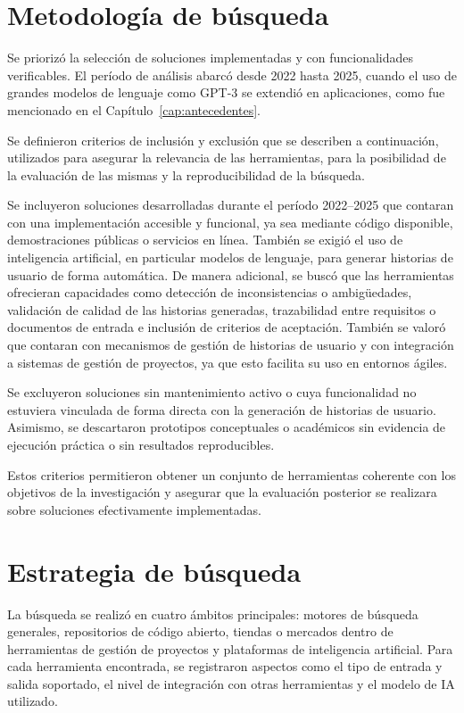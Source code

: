 \section{Metodología de búsqueda}
Se priorizó la selección de soluciones implementadas y con funcionalidades verificables. El período de análisis abarcó desde 2022 hasta 2025, cuando el uso de grandes modelos de lenguaje como GPT-3 se extendió en aplicaciones, como fue mencionado en el Capítulo~\ref{cap:antecedentes}.

Se definieron criterios de inclusión y exclusión que se describen a continuación, utilizados para asegurar la relevancia de las herramientas, para la posibilidad de la evaluación de las mismas y la reproducibilidad de la búsqueda.

Se incluyeron soluciones desarrolladas durante el período 2022--2025 que contaran con una implementación accesible y funcional, ya sea mediante código disponible, demostraciones públicas o servicios en línea. También se exigió el uso de inteligencia artificial, en particular modelos de lenguaje, para generar historias de usuario de forma automática. De manera adicional, se buscó que las herramientas ofrecieran capacidades como detección de inconsistencias o ambigüedades, validación de calidad de las historias generadas, trazabilidad entre requisitos o documentos de entrada e inclusión de criterios de aceptación. También se valoró que contaran con mecanismos de gestión de historias de usuario y con integración a sistemas de gestión de proyectos, ya que esto facilita su uso en entornos ágiles.

Se excluyeron soluciones sin mantenimiento activo o cuya funcionalidad no estuviera vinculada de forma directa con la generación de historias de usuario. Asimismo, se descartaron prototipos conceptuales o académicos sin evidencia de ejecución práctica o sin resultados reproducibles.

Estos criterios permitieron obtener un conjunto de herramientas coherente con los objetivos de la investigación y asegurar que la evaluación posterior se realizara sobre soluciones efectivamente implementadas.

\section{Estrategia de búsqueda}
La búsqueda se realizó en cuatro ámbitos principales: motores de búsqueda generales, repositorios de código abierto, tiendas o mercados dentro de herramientas de gestión de proyectos y plataformas de inteligencia artificial. Para cada herramienta encontrada, se registraron aspectos como el tipo de entrada y salida soportado, el nivel de integración con otras herramientas y el modelo de IA utilizado.

